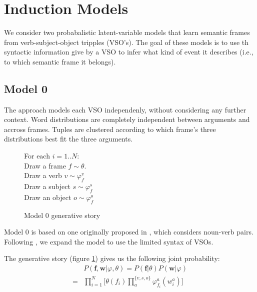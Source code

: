 \documentclass{article} %
\renewcommand\phi\varphi
\begin{document}
\section{Induction Models}
\label{models}
We consider two probabalistic latent-variable models that learn semantic frames
from verb-subject-object tripples (VSO's).
The goal of these models is to use th syntactic information give by a VSO to
infer what kind of event it describes (i.e., to which semantic frame it belongs).

\subsection{Model 0}

The approach models each VSO independenly, without considering any further context.
Word distributions are completely independent between arguments and accross frames.
Tuples are clustered according to which frame's three distributions best fit the 
three arguments.

\begin{figure}

    \begin{snugshade}
    \scriptsize
    For each $i = 1..N$:\\
    \hspace*{15pt} Draw a frame $f \sim \theta$.\\
    \hspace*{15pt} Draw a verb $v \sim \phi_f^v$\\
    \hspace*{15pt} Draw a subject $s \sim \phi_f^s$\\
    \hspace*{15pt} Draw an object $o \sim \phi_f^o$
    \end{snugshade}

    

    \caption{Model 0 generative story}
    \label{gen0}

\end{figure}

Model 0 is based on one originally proposed in \citet{rooth1999}, which 
considers noun-verb pairs. Following \citet{oconnor2013}, we expand the model
to use the limited syntax of VSOs.

The generative story (figure \ref{gen0}) gives us the following joint probability:
\begin{align*}
&P(\mathbf{f},\mathbf{w}|\phi,\theta) 
  = P(\mathbf{f}|\theta)P(\mathbf{w}|\phi)\\
  =& \prod_{i=1}^{N}\big[\theta(f_i) \prod_a^{\{v,s,o\}}\phi_{f_i}^a(w_i^a)\big]
\end{align*}
\end{document}
